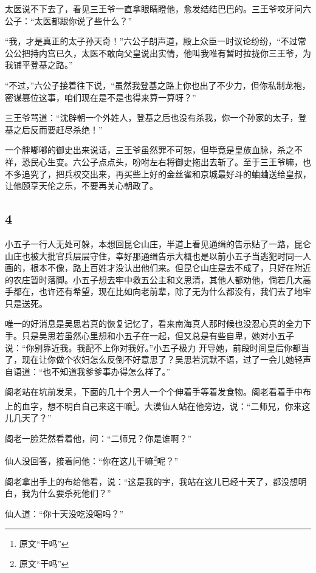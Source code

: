 太医说不下去了，看见三王爷一直拿眼睛瞪他，愈发结结巴巴的。三王爷咬牙问六公子：“太医都跟你说了些什么？”

“我，才是真正的太子孙天奇！”六公子朗声道，殿上众臣一时议论纷纷，“不过常公公把持内宫已久，太医不敢向父皇说出实情，他叫我唯有暂时拉拢你三王爷，为我铺平登基之路。”

“不过，”六公子接着往下说，“虽然我登基之路上你也出了不少力，但你私制龙袍，密谋篡位这事，咱们现在是不是也得来算一算呀？”

三王爷骂道：“沈辟朝一个外姓人，登基之后也没有杀我，你一个孙家的太子，登基之后反而要赶尽杀绝！”

一个胖嘟嘟的御史出来说话，三王爷虽然罪不可恕，但毕竟是皇族血脉，杀之不祥，恐民心生变。六公子点点头，吩咐左右将御史拖出去斩了。至于三王爷嘛，也不多追究了，把兵权交出来，再买些上好的金丝雀和京城最好斗的蛐蛐送给皇叔，让他颐享天伦之乐，不要再关心朝政了。
\newline

{\centering\subsection{4}}

小五子一行人无处可躲，本想回昆仑山庄，半道上看见通缉的告示贴了一路，昆仑山庄也被大批官兵层层守住，幸好那通缉告示大概也是以前小五子当逃犯时同一人画的，根本不像，路上百姓才没认出他们来。但昆仑山庄是去不成了，只好在附近的农庄暂时落脚。小五子想去牢中救五公主和文思清，其他人都劝他，倘若几大高手都在，也许还有希望，现在比如向老前辈，除了无为什么都没有，我们去了地牢只是送死。

唯一的好消息是吴思若真的恢复记忆了，看来南海真人那时候也没忍心真的全力下手。只是吴思若虽然心里想和小五子在一起，但又总是有些自卑，她对小五子说：“你别靠近我。我配不上你对我好。”小五子极力
开导她，前段时间皇后你都当了，现在让你做个农妇怎么反倒不好意思了？吴思若沉默不语，过了一会儿她轻声自语道：“也不知道我爹爹事办得怎么样了。”
\newline

阁老站在坑前发呆，下面的几十个男人一个个伸着手等着发食物。阁老看着手中布上的血字，想不明白自己来这干嘛\footnote{原文“干吗”}。大漠仙人站在他旁边，说：“二师兄，你来这儿几天了？”

阁老一脸茫然看着他，问：“二师兄？你是谁啊？”

仙人没回答，接着问他：“你在这儿干嘛\footnote{原文“干吗”}呢？”

阁老拿出手上的布给他看，说：“这是我的字，我站在这儿已经十天了，都没想明白，我为什么要杀死他们？”

仙人道：“你十天没吃没喝吗？”

